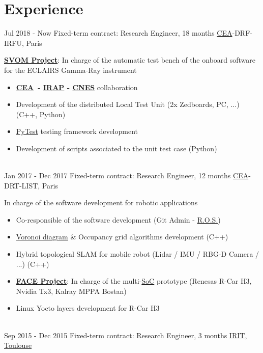 \documentclass[letterpaper]{twentysecondcv} %
\newcommand{\cea}{\href{http://www.cea.fr/english}{CEA}}
\newcommand{\ros}{\href{http://www.ros.org/}{R.O.S.}}
\begin{document}
\section{Experience}
\begin{twenty} %
  \twentyitem
  {Jul 2018 -}
  {Now}
  {Fixed-term contract: Research Engineer, 18 months}
  {\cea-DRF-IRFU, Paris}
  {
    \textbf{\href{http://www.svom.fr/en/}{SVOM Project}}: In charge of the
    automatic test bench of the onboard software for the ECLAIRS Gamma-Ray instrument
    \begin{itemize}
    \item \textbf{\cea\ - \href{http://www.irap.omp.eu/en/}{IRAP} -
        \href{https://cnes.fr/en}{CNES}} collaboration
    \item Development of the distributed Local Test Unit (2x Zedboards, PC, ...)
      (C++, Python)
    \item \href{https://docs.pytest.org/en/latest/contents.html}{PyTest}
      testing framework development
    \item Development of scripts associated to the unit test case (Python)
    \end{itemize}
  }
  \\
  \twentyitem
  {Jan 2017 -}
  {Dec 2017}
  {Fixed-term contract: Research Engineer, 12 months}
  {\cea-DRT-LIST, Paris}
  {
    In charge of the software development for robotic applications
    \begin{itemize}
    \item Co-responsible of the software development (Git Admin - \ros)
    \item \href{https://en.wikipedia.org/wiki/Voronoi_diagram}{Voronoi diagram}
      \& Occupancy grid algorithms development (C++)
    \item Hybrid topological SLAM for mobile robot (Lidar / IMU / RBG-D Camera /
      ...) (C++)
    \item
      \textbf{\href{https://www.youtube.com/watch?time_continue=3&v=mneZNnir0s0}{FACE
        Project}}: In charge of the multi-\href{https://en.wikipedia.org/wiki/System_on_a_chip}{SoC} prototype (Renesas
      R-Car H3, Nvidia Tx3, Kalray MPPA Bostan)
    \item Linux Yocto layers development for R-Car H3
    \end{itemize}
  }
  \\
  \twentyitem
  {Sep 2015 -}
  {Dec 2015}
  {Fixed-term contract: Research Engineer, 3 months}  
  {\href{https://www.irit.fr/?lang=en}{IRIT, Toulouse}}

\end{twenty}
\end{document}
